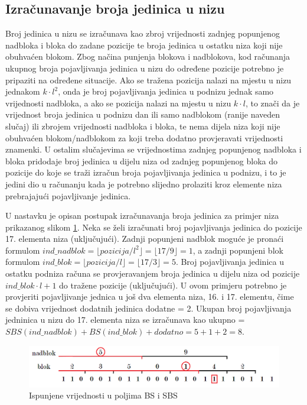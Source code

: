 \subsection{Izračunavanje broja jedinica u nizu}
Broj jedinica u nizu se izračunava kao zbroj vrijednosti zadnjeg popunjenog nadbloka i bloka do zadane pozicije te broja jedinica u ostatku niza koji nije obuhvaćen blokom. Zbog načina punjenja blokova i nadblokova, kod računanja ukupnog broja pojavljivanja jedinica u nizu do određene pozicije potrebno je pripaziti na određene situacije. Ako se tražena pozicija nalazi na mjestu u nizu jednakom $k\cdot l^2$, onda je broj pojavljivanja jedinica u podnizu jednak samo vrijednosti nadbloka, a ako se pozicija nalazi na mjestu u nizu $k\cdot l$, to znači da je vrijednost broja jedinica u podnizu dan ili samo nadblokom (ranije naveden slučaj) ili zbrojem vrijednosti nadbloka i bloka, te nema dijela niza koji nije obuhvaćen blokom/nadblokom za koji treba dodatno provjeravati vrijednosti znamenki. U ostalim slučajevima se vrijednostima zadnjeg popunjenog nadbloka i bloka pridodaje broj jedinica u dijelu niza od zadnjeg popunjenog bloka do pozicije do koje se traži izračun broja pojavljivanja jedinica u podnizu, i to je jedini dio u računanju kada je potrebno slijedno prolaziti kroz elemente niza prebrajajući pojavljivanje jedinica.

U nastavku je opisan postupak izračunavanja broja jedinica za primjer niza prikazanog slikom \ref{rrr2}. Neka se želi izračunati broj pojavljivanja jedinica do pozicije 17. elementa niza (uključujući). Zadnji popunjeni nadblok moguće je pronaći formulom $ind\_nadblok = \lfloor pozicija/l^2 \rfloor = \lfloor 17/9 \rfloor = 1$, a zadnji popunjeni blok formulom $ind\_blok = \lfloor pozicija/l \rfloor = \lfloor 17/3 \rfloor = 5$. Broj pojavljivanja jedinica u ostatku podniza računa se provjeravanjem broja jedinica u dijelu niza od pozicije $ind\_blok\cdot l+1$ do tražene pozicije (uključujući). U ovom primjeru potrebno je provjeriti pojavljivanje jednica u još dva elementa niza, 16. i 17. elementu, čime se dobiva vrijednost dodatnih jedinica dodatne = 2. Ukupan broj pojavljivanja jedninica u nizu do 17. elementa niza se izračunava kao ukupno  = $SBS(ind\_nadblok) + BS(ind\_blok) + dodatno = 5 + 1 + 2 = 8$.

\begin{figure}[H]
\centering
\includegraphics[width=\linewidth]{./pictures/rrr2.png}
\caption{Ispunjene vrijednosti u poljima BS i SBS}\label{rrr2}
\end{figure}



